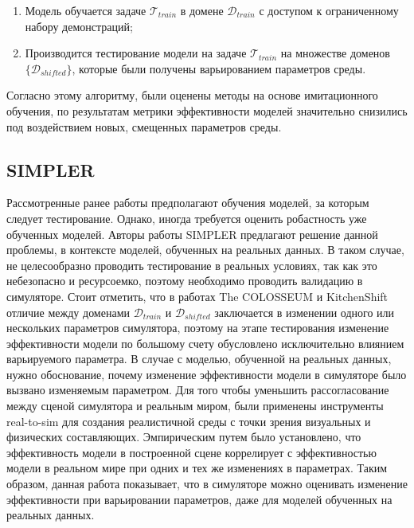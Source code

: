             \begin{enumerate}
                \item Модель обучается задаче $\mathcal{T}_{train}$ в домене $\mathcal{D}_{train}$ с доступом к ограниченному набору демонстраций;
                \item Производится тестирование модели на задаче $\mathcal{T}_{train}$ на множестве доменов $\{\mathcal{D}_{shifted}\}$, которые были получены варьированием параметров среды.
            \end{enumerate}
    
        Согласно этому алгоритму, были оценены методы на основе имитационного обучения, по результатам метрики эффективности моделей значительно снизились под воздействием новых, смещенных параметров среды.
    
        \subsection{SIMPLER}
    
            Рассмотренные ранее работы предполагают обучения моделей, за которым следует тестирование. Однако, иногда требуется оценить робастность уже обученных моделей.
            Авторы работы SIMPLER \cite{li24simpler} предлагают решение данной проблемы, в контексте моделей, обученных на реальных данных. В таком случае, не целесообразно проводить тестирование в реальных условиях, так как это небезопасно и ресурсоемко, поэтому необходимо проводить валидацию в симуляторе. Стоит отметить, что в работах The COLOSSEUM и KitchenShift отличие между доменами $\mathcal{D}_{train}$ и $\mathcal{D}_{shifted}$ заключается в изменении одного или нескольких параметров симулятора, поэтому на этапе тестирования изменение эффективности модели по большому счету обусловлено исключительно влиянием варьируемого параметра. В случае с моделью, обученной на реальных данных, нужно обоснование, почему изменение эффективности модели в симуляторе было вызвано изменяемым параметром. Для того чтобы уменьшить рассогласование между сценой симулятора и реальным миром, были применены инструменты real-to-sim для создания реалистичной среды с точки зрения визуальных и физических составляющих. Эмпирическим путем было установлено, что эффективность модели в построенной сцене коррелирует с эффективностью модели в реальном мире при одних и тех же изменениях в параметрах. Таким образом, данная работа показывает, что в симуляторе можно оценивать изменение эффективности при варьировании параметров, даже для моделей обученных на реальных данных. 
    
